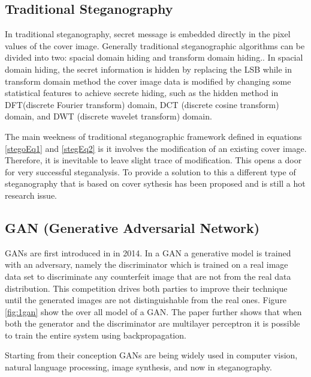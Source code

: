 \documentclass[../main/main.tex]{subfiles}
\begin{document}
	\subsection{Traditional Steganography}
	In traditional steganography, secret message is embedded directly in the pixel values of the cover image. Generally traditional steganographic algorithms can be divided into two: spacial domain hiding and transform domain hiding.. In spacial domain hiding, the secret information is hidden by replacing the \gls{LSB} while in transform domain method the cover image data is modified by changing some statistical features to achieve secrete hiding, such as the hidden method in \gls{DFT}(discrete Fourier transform) domain, \gls{DCT} (discrete cosine transform) domain, and \gls{DWT} (discrete wavelet transform) domain. 
	
	The main weekness of traditional steganographic framework defined in equations \ref{stegoEq1} and \ref{stegEq2} is it involves the modification of an existing cover image. Therefore, it is inevitable to leave slight trace of modification. This opens a door for very successful steganalysis. To provide a solution to this a different type of steganography that is based on cover sythesis has been proposed and is still a hot research issue. 
	
	\subsection{\gls{GAN} (Generative Adversarial Network)}
	 
	 \gls{GAN}s are first introduced in  in 2014. In a \gls{GAN} a generative model is trained with an adversary, namely the discriminator  which is trained on a real image data set to discriminate any counterfeit image that are not from the real data distribution. This competition drives both parties to improve their technique until the generated images are not distinguishable from the real ones. Figure \ref{fig:1gan} show the over all model of a \gls{GAN}. The paper  further shows that when both the generator and the discriminator are multilayer perceptron it is possible to train the entire system using backpropagation.  
	
	Starting from their conception \gls{GAN}s are being widely used in computer vision, natural language processing, image synthesis, and now in steganography.  
\end{document}
